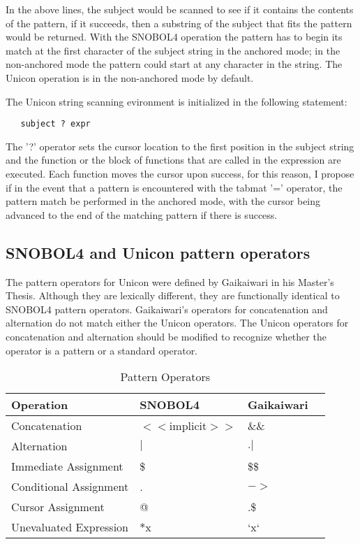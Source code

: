 \documentclass{article}
\begin{document}
In the above lines, the subject would be scanned to see if it contains the contents of the pattern, if it succeeds, then a substring of the subject that fits the pattern would be returned.  With the SNOBOL4 operation the pattern has to begin its match at the first character of the subject string in the anchored mode; in the non-anchored mode the pattern could start at any character in the string. \cite{Snobol}  The Unicon operation is in the non-anchored mode by default. \cite{Gaikaiwari2005}

The Unicon string scanning evironment is initialized in the following statement:

\linespread{1}
\begin{verbatim}
   subject ? expr
\end{verbatim}

The '?' operator sets the cursor location to the first position in the subject string and the function or the block of functions that are called in the expression are executed.  Each function moves the cursor upon success, for this reason, I propose if in the event that a pattern is encountered with the tabmat '=' operator, the pattern match be performed in the anchored mode, with the cursor being advanced to the end of the matching pattern if there is success.

\subsection{SNOBOL4 and Unicon pattern operators}
The pattern operators for Unicon were defined by Gaikaiwari in his Master's Thesis.  Although they are lexically different, they are functionally identical to SNOBOL4 pattern operators.  Gaikaiwari's operators for concatenation and alternation do not match either the Unicon operators.  The Unicon operators for concatenation and alternation should be modified to recognize whether the operator is a pattern or a standard operator.

\begin{table}[ht]
	\caption{Pattern Operators}
	\centering
	\begin{tabular}{|l|l|l|l|}
		\hline\hline
		Operation & SNOBOL4 & Gaikaiwari \\
		\hline
		Concatenation & $<<$implicit$>>$ & \&\& \\
		Alternation & $|$ & $.|$ \\
		\hline
		Immediate Assignment & \$ & \$\$ \\
		Conditional Assignment & . & $->$ \\
		Cursor Assignment & @ & .\$ \\
		\hline
		Unevaluated Expression & $*$x & `x` \\
		\hline
	\end{tabular}
\end{table}
\pagebreak
\end{document}
